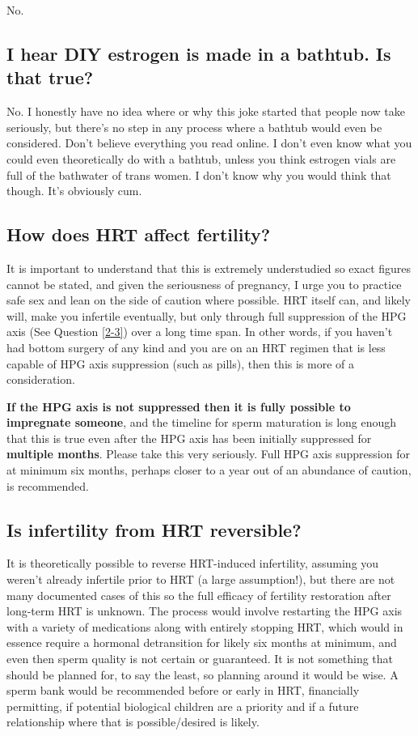 \documentclass{article}
\begin{document}
No.

\subsection{I hear DIY estrogen is made in a bathtub. Is that true?}

No. I honestly have no idea where or why this joke started that people now take seriously, but there’s no step in any process where a bathtub would even be considered. Don’t believe everything you read online. I don’t even know what you could even theoretically do with a bathtub, unless you think estrogen vials are full of the bathwater of trans women. I don’t know why you would think that though. It’s obviously cum.

\subsection{How does HRT affect fertility?}\label{11-42}

It is important to understand that this is extremely understudied so exact figures cannot be stated, and given the seriousness of pregnancy, I urge you to practice safe sex and lean on the side of caution where possible. HRT itself can, and likely will, make you infertile eventually, but only through full suppression of the HPG axis (See Question \ref{2-3}) over a long time span. In other words, if you haven't had bottom surgery of any kind and you are on an HRT regimen that is less capable of HPG axis suppression (such as pills), then this is more of a consideration.

\textbf{If the HPG axis is not suppressed then it is fully possible to impregnate someone}, and the timeline for sperm maturation is long enough that this is true even after the HPG axis has been initially suppressed for \textbf{multiple months}. Please take this very seriously. Full HPG axis suppression for at minimum six months, perhaps closer to a year out of an abundance of caution, is recommended.

\subsection{Is infertility from HRT reversible?}\label{11-43}

It is theoretically possible to reverse HRT-induced infertility, assuming you weren't already infertile prior to HRT (a large assumption!), but there are not many documented cases of this so the full efficacy of fertility restoration after long-term HRT is unknown. The process would involve restarting the HPG axis with a variety of medications along with entirely stopping HRT, which would in essence require a hormonal detransition for likely six months at minimum, and even then sperm quality is not certain or guaranteed. It is not something that should be planned for, to say the least, so planning around it would be wise. A sperm bank would be recommended before or early in HRT, financially permitting, if potential biological children are a priority and if a future relationship where that is possible/desired is likely.
\end{document}
